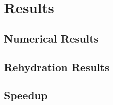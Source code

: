 \chapter{Results}

\section{Numerical Results}

\section{Rehydration Results}

\section{Speedup}
\newpage